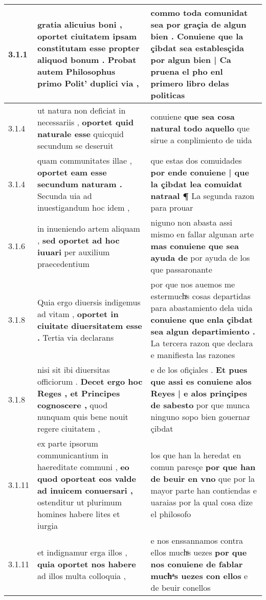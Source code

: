 \begin{tabular}{|p{1cm}|p{6.5cm}|p{6.5cm}|}
3.1.1 & gratia alicuius boni , \textbf{ oportet ciuitatem ipsam constitutam esse propter aliquod bonum . } Probat autem Philosophus primo Polit’ duplici via , & commo toda comunidat sea por graçia de algun bien . \textbf{ Conuiene que la çibdat sea establesçida por algun bien | Ca pruena el pho } enl primero libro delas politicas \\\hline
3.1.4 & ut natura non deficiat in necessariis , \textbf{ oportet quid naturale esse } quicquid secundum se deseruit & conuiene \textbf{ que sea cosa natural todo aquello } que sirue a conplimiento de uida \\\hline
3.1.4 & quam communitates illae , \textbf{ oportet eam esse secundum naturam . } Secunda uia ad inuestigandum hoc idem , & que estas dos comuidades \textbf{ por ende conuiene | que la çibdat lea comuidat natraal ¶ } La segunda razon para prouar \\\hline
3.1.6 & in inueniendo artem aliquam , \textbf{ sed oportet ad hoc iuuari } per auxilium praecedentium & niguno non abasta assi mismo en fallar algunan arte \textbf{ mas conuiene que sea ayuda de } por ayuda de los que passaronante \\\hline
3.1.8 & Quia ergo diuersis indigemus ad vitam , \textbf{ oportet in ciuitate diuersitatem esse . } Tertia via declarans & por que nos auemos me estermuchͣs cosas departidas para abastamiento dela uida \textbf{ conuiene que enla çibdat sea algun departimiento . } La tercera razon que declara e manifiesta las razones \\\hline
3.1.8 & nisi sit ibi diuersitas officiorum . \textbf{ Decet ergo hoc Reges , et Principes cognoscere , } quod nunquam quis bene nouit regere ciuitatem , & e de los ofiçiales . \textbf{ Et pues que assi es conuiene alos Reyes | e alos prinçipes de sabesto } por que munca ninguno sopo bien gouernar çibdat \\\hline
3.1.11 & ex parte ipsorum communicantium in haereditate communi , \textbf{ eo quod oporteat eos valde ad inuicem conuersari , } ostenditur ut plurimum homines habere lites et iurgia & los que han la heredat en comun paresçe \textbf{ por que han de beuir en vno } que por la mayor parte han contiendas e uaraias por la qual cosa dize el philosofo \\\hline
3.1.11 & et indignamur erga illos , \textbf{ quia oportet nos habere } ad illos multa colloquia , & e nos enssannamos contra ellos muchͣs uezes \textbf{ por que nos conuiene de fablar muchͣs uezes con ellos } e de beuir conellos \\\hline

\end{tabular}

